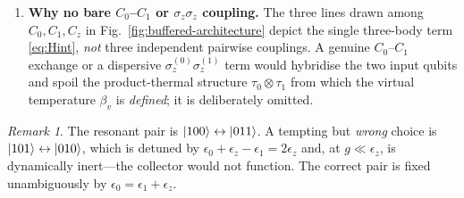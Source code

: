 \documentclass[11pt,a4paper]{article}
\theoremstyle{definition}
\theoremstyle{remark}
\newtheorem{remark}{Remark}[section]
\begin{document}
\begin{enumerate}[label=(\roman*),leftmargin=*]
$\sigma_+^{(0)}\sigma_+^{(1)}\sigma_+^{(z)}$ create three excitations and
rotate at $\epsilon_0+\epsilon_1+\epsilon_z$; they would inject energy
with no bath to supply it. The RWA discards them with relative error
$\mathcal{O}(g/\epsilon)$.
\item \textbf{Why no bare $C_0$--$C_1$ or $\sigma_z\sigma_z$ coupling.}
The three lines drawn among $C_0,C_1,C_z$ in
Fig.~\ref{fig:buffered-architecture} depict the single three-body term
\eqref{eq:Hint}, \emph{not} three independent pairwise couplings. A
genuine $C_0$--$C_1$ exchange or a dispersive $\sigma_z^{(0)}\sigma_z^{(1)}$
term would hybridise the two input qubits and spoil the product-thermal
structure $\tau_0\otimes\tau_1$ from which the virtual temperature
$\beta_v$ is \emph{defined}; it is deliberately omitted.
\end{enumerate}
\begin{remark}
The resonant pair is $\ket{100}\leftrightarrow\ket{011}$. A tempting but
\emph{wrong} choice is $\ket{101}\leftrightarrow\ket{010}$, which is
detuned by $\epsilon_0+\epsilon_z-\epsilon_1=2\epsilon_z$ and, at
$g\ll\epsilon_z$, is dynamically inert---the collector would not
function. The correct pair is fixed unambiguously by
$\epsilon_0=\epsilon_1+\epsilon_z$.
\end{remark}
\end{document}
